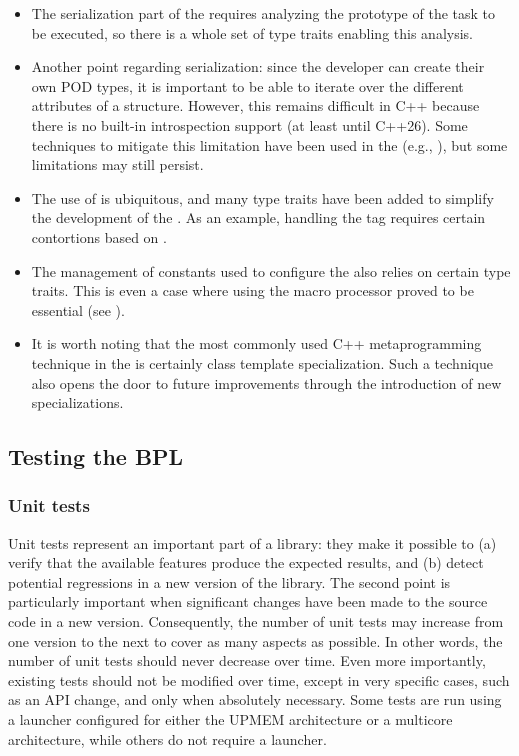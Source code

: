 \begin{itemize}

\item The serialization part of the \BPL requires analyzing the prototype of the task to be executed, so there is a whole set of type traits enabling this analysis.

\item Another point regarding serialization: since the developer can create their own POD types, it is important to be able to iterate over the different attributes of a structure. However, this remains difficult in C++ because there is  no built-in introspection support (at least until C++26). Some techniques to mitigate this limitation have been used in  the \BPL (e.g., ), but some limitations may still persist.

\item The use of  is ubiquitous, and many type traits have been added to simplify the development of the \BPL.  As an example, handling the  tag requires certain contortions based on .

\item The management of constants used to configure the \BPL also relies on certain type traits.  This is even a case where using the macro processor proved to be essential (see ).

\item It is worth noting that the most commonly used C++ metaprogramming technique in the \BPL is certainly  class template specialization. Such a technique also opens the door to future improvements through the introduction 
of new specializations.

\end{itemize}

\subsection{Testing the BPL}

\subsubsection{Unit tests}

Unit tests represent an important part of a library: they make it possible to (a) verify that the available features produce the expected results, and (b) detect potential regressions in a new version of the library. The second point is particularly important when significant changes have been made to the source code in a new version. Consequently, the number of unit tests may increase from one version to the next to cover as many aspects as possible. In other words, the number of unit tests should never decrease over time.
Even more importantly, existing tests should not be modified over time, except in very specific cases, such as an API change, and only when absolutely necessary. Some tests are run using a launcher configured for either the UPMEM architecture or a multicore architecture, while others do not require a launcher.

